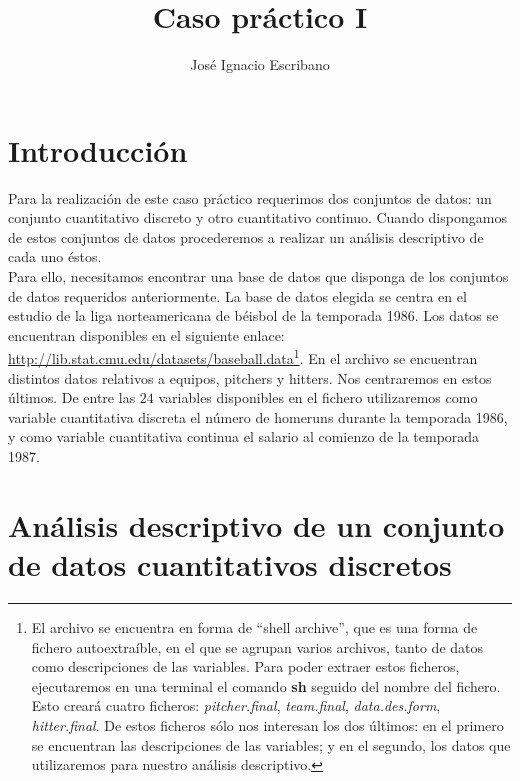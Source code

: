 \documentclass[12pt,a4paper,twoside,openright,titlepage,final]{article}
\author{José Ignacio Escribano}
\title{Caso práctico I}
\begin{document}
\setcounter{page}{1}


\listoffigures
\thispagestyle{empty}
\newpage

\tableofcontents
\thispagestyle{empty}
\newpage


\setcounter{page}{1}

\section{Introducción}

Para la realización de este caso práctico requerimos dos conjuntos de datos: un conjunto cuantitativo discreto y otro cuantitativo continuo. Cuando dispongamos de estos conjuntos de datos procederemos a realizar un análisis descriptivo de cada uno éstos.\\

Para ello, necesitamos encontrar una base de datos que disponga de los conjuntos de datos requeridos anteriormente. La base de datos elegida se centra en el estudio de la liga norteamericana de béisbol de la temporada 1986. Los datos se encuentran disponibles en el siguiente enlace: \url{http://lib.stat.cmu.edu/datasets/baseball.data}\footnote{El archivo se encuentra en forma de ``shell archive'', que es una forma de fichero autoextraíble, en el que se agrupan varios archivos, tanto de datos como descripciones de las variables. Para poder extraer estos ficheros, ejecutaremos en una terminal el comando \textbf{sh} seguido del nombre del fichero. Esto creará cuatro ficheros: \textit{pitcher.final}, \textit{team.final}, \textit{data.des.form}, \textit{hitter.final}. De estos ficheros sólo nos interesan los dos últimos: en el primero se encuentran las descripciones de las variables; y en el segundo, los datos que utilizaremos para nuestro análisis descriptivo.}. En el archivo se encuentran distintos datos relativos a equipos, pitchers y hitters. Nos centraremos en estos últimos. De entre las $24$ variables disponibles en el fichero utilizaremos como variable cuantitativa discreta el número de homeruns durante la temporada 1986, y como variable cuantitativa continua el salario al comienzo de la temporada 1987.  

\section{Análisis descriptivo de un conjunto de datos cuantitativos discretos}
\end{document}
